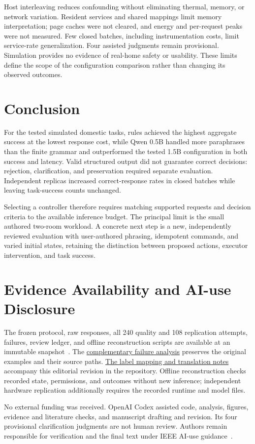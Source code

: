 \documentclass[letterpaper,conference]{IEEEtran}
\providecommand{\StudyPrefix}{}
\begin{document}
Host interleaving reduces confounding without eliminating thermal, memory, or network variation. Resident services and shared mappings limit memory interpretation; page caches were not cleared, and energy and per-request peaks were not measured. Few closed batches, including instrumentation costs, limit service-rate generalization. Four assisted judgments remain provisional. Simulation provides no evidence of real-home safety or usability. These limits define the scope of the configuration comparison rather than changing its observed outcomes.

\section{Conclusion}
For the tested simulated domestic tasks, rules achieved the highest aggregate success at the lowest response cost, while Qwen 0.5B handled more paraphrases than the finite grammar and outperformed the tested 1.5B configuration in both success and latency. Valid structured output did not guarantee correct decisions: rejection, clarification, and preservation required separate evaluation. Independent replicas increased correct-response rates in closed batches while leaving task-success counts unchanged.

Selecting a controller therefore requires matching supported requests and decision criteria to the available inference budget. The principal limit is the small authored two-room workload. A concrete next step is a new, independently reviewed evaluation with user-authored phrasing, idempotent commands, and varied initial states, retaining the distinction between proposed actions, executor intervention, and task success.

\section*{Evidence Availability and AI-use Disclosure}
The frozen protocol, raw responses, all 240 quality and 108 replication attempts, failures, review ledger, and offline reconstruction scripts are available at an immutable snapshot~\cite{artifact}. The \href{https://github.com/hudsonmoreira-spec/labrador-distributed-llm-benchmarks/tree/f2f566b179fcf3893099d7d1b12b888455e531ae/experiments/smarthome_agents/analysis/failure-review-20261028}{complementary failure analysis} preserves the original examples and their source paths. \href{https://github.com/hudsonmoreira-spec/labrador-distributed-llm-benchmarks/tree/c0650b876b5e1a9169782d9cc0819c078b13fbe9/paper/smarthome_agents/study_v1/editorial_20261029}{The label mapping and translation notes} accompany this editorial revision in the repository. Offline reconstruction checks recorded state, permissions, and outcomes without new inference; independent hardware replication additionally requires the recorded runtime and model files.

No external funding was received. OpenAI Codex assisted code, analysis, figures, evidence and literature checks, and manuscript drafting and revision. Its four provisional clarification judgments are not human review. Authors remain responsible for verification and the final text under IEEE AI-use guidance~\cite{ieeeai}.
\balance


\end{document}
